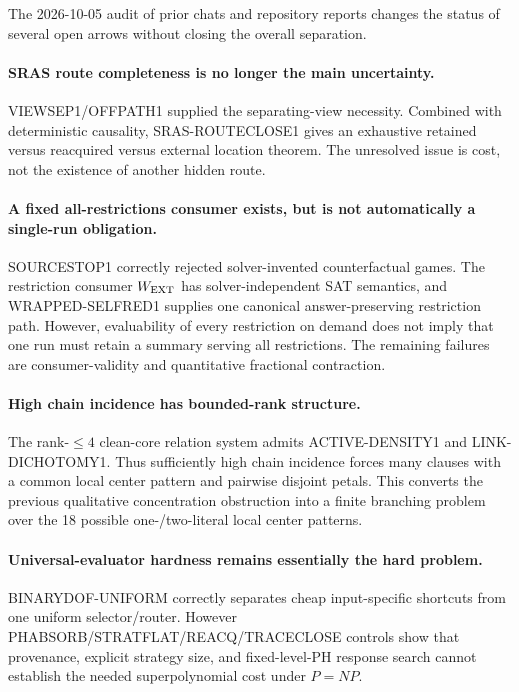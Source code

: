 \documentclass[11pt]{article}
\theoremstyle{plain}
\theoremstyle{definition}
\theoremstyle{remark}
\begin{document}
The 2026-10-05 audit of prior chats and repository reports changes the status
of several open arrows without closing the overall separation.

\paragraph{SRAS route completeness is no longer the main uncertainty.}
VIEWSEP1/OFFPATH1 supplied the separating-view necessity. Combined with
deterministic causality, SRAS-ROUTECLOSE1 gives an exhaustive retained versus
reacquired versus external location theorem. The unresolved issue is cost, not
the existence of another hidden route.

\paragraph{A fixed all-restrictions consumer exists, but is not automatically a single-run obligation.}
SOURCESTOP1 correctly rejected solver-invented counterfactual games.  The
restriction consumer $W_{\rm EXT}$ has solver-independent SAT semantics, and
WRAPPED-SELFRED1 supplies one canonical answer-preserving restriction path.
However, evaluability of every restriction on demand does not imply that one
run must retain a summary serving all restrictions.  The remaining failures
are consumer-validity and quantitative fractional contraction.

\paragraph{High chain incidence has bounded-rank structure.}
The rank-$\le4$ clean-core relation system admits ACTIVE-DENSITY1 and
LINK-DICHOTOMY1. Thus sufficiently high chain incidence forces many clauses
with a common local center pattern and pairwise disjoint petals. This converts
the previous qualitative concentration obstruction into a finite branching
problem over the 18 possible one-/two-literal local center patterns.

\paragraph{Universal-evaluator hardness remains essentially the hard problem.}
BINARYDOF-UNIFORM correctly separates cheap input-specific shortcuts from one
uniform selector/router. However PHABSORB/STRATFLAT/REACQ/TRACECLOSE controls
show that provenance, explicit strategy size, and fixed-level-PH response
search cannot establish the needed superpolynomial cost under $P=NP$.
\end{document}
